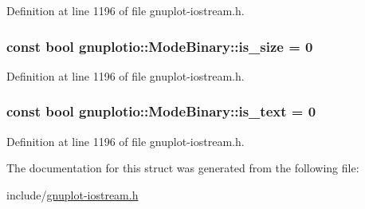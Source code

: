 Definition at line 1196 of file gnuplot-\/iostream.\+h.

\subsubsection[{\texorpdfstring{is\+\_\+size}{is_size}}]{\setlength{\rightskip}{0pt plus 5cm}const bool gnuplotio\+::\+Mode\+Binary\+::is\+\_\+size = 0\hspace{0.3cm}{\ttfamily [static]}}\hypertarget{structgnuplotio_1_1_mode_binary_a6eae25ea662362bbb88bc987d6025290}{}\label{structgnuplotio_1_1_mode_binary_a6eae25ea662362bbb88bc987d6025290}


Definition at line 1196 of file gnuplot-\/iostream.\+h.

\subsubsection[{\texorpdfstring{is\+\_\+text}{is_text}}]{\setlength{\rightskip}{0pt plus 5cm}const bool gnuplotio\+::\+Mode\+Binary\+::is\+\_\+text = 0\hspace{0.3cm}{\ttfamily [static]}}\hypertarget{structgnuplotio_1_1_mode_binary_ac89064b5df24f7ef4d765fdfde4fd1b6}{}\label{structgnuplotio_1_1_mode_binary_ac89064b5df24f7ef4d765fdfde4fd1b6}


Definition at line 1196 of file gnuplot-\/iostream.\+h.



The documentation for this struct was generated from the following file\+:\begin{DoxyCompactItemize}
\item 
include/\hyperlink{gnuplot-iostream_8h}{gnuplot-\/iostream.\+h}\end{DoxyCompactItemize}
